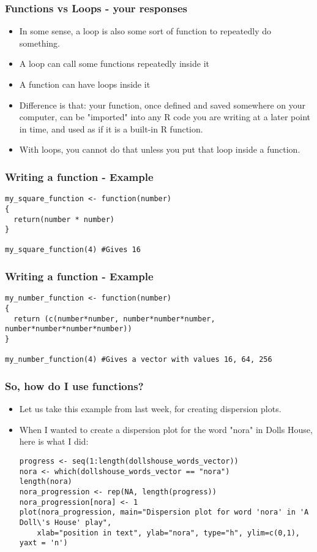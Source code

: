 \documentclass{beamer}
\begin{document}
\begin{frame}
\frametitle{Functions vs Loops - your responses}
\begin{itemize}
\item In some sense, a loop is also some sort of function to repeatedly do something.
\item A loop can call some functions repeatedly inside it
\item A function can have loops inside it \pause
\item Difference is that: your function, once defined and saved somewhere on your computer, can be "imported" into any R code you are writing at a later point in time, and used as if it is a built-in R function. \pause
\item With loops, you cannot do that unless you put that loop inside a function. 
\end{itemize}
\end{frame}

\begin{frame}[fragile]
\frametitle{Writing a function - Example}
\scriptsize
\begin{verbatim}
my_square_function <- function(number)
{
  return(number * number)
}

my_square_function(4) #Gives 16
\end{verbatim}
\end{frame}

\begin{frame}[fragile]
\frametitle{Writing a function - Example}
\scriptsize
\begin{verbatim}
my_number_function <- function(number)
{
  return (c(number*number, number*number*number, number*number*number*number))
}

my_number_function(4) #Gives a vector with values 16, 64, 256
\end{verbatim}
\end{frame}

\begin{frame}[fragile]
\frametitle{So, how do I use functions?}
\begin{itemize}
\item Let us take this example from last week, for creating dispersion plots.
\item When I wanted to create a dispersion plot for the word "nora" in Dolls House, here is what I did:
\tiny
\begin{verbatim}
progress <- seq(1:length(dollshouse_words_vector))
nora <- which(dollshouse_words_vector == "nora")
length(nora)
nora_progression <- rep(NA, length(progress))
nora_progression[nora] <- 1
plot(nora_progression, main="Dispersion plot for word 'nora' in 'A Doll\'s House' play",
    xlab="position in text", ylab="nora", type="h", ylim=c(0,1), yaxt = 'n')	
\end{verbatim}
\end{itemize}
\end{frame}
\end{document}
